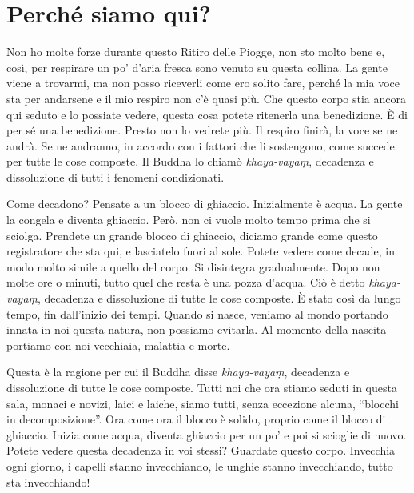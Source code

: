 \chapter{Perché siamo qui?}

Non ho molte forze durante questo Ritiro delle Piogge, non sto molto
bene e, così, per respirare un po' d'aria fresca sono venuto su questa
collina. La gente viene a trovarmi, ma non posso riceverli come ero
solito fare, perché la mia voce sta per andarsene e il mio respiro non
c'è quasi più. Che questo corpo stia ancora qui seduto e lo possiate
vedere, questa cosa potete ritenerla una benedizione. È di per sé una
benedizione. Presto non lo vedrete più. Il respiro finirà, la voce se ne
andrà. Se ne andranno, in accordo con i fattori che li sostengono, come
succede per tutte le cose composte. Il Buddha lo chiamò
\emph{khaya-vayaṃ}, decadenza e dissoluzione di tutti i fenomeni
condizionati.

Come decadono? Pensate a un blocco di ghiaccio. Inizialmente è acqua. La
gente la congela e diventa ghiaccio. Però, non ci vuole molto tempo
prima che si sciolga. Prendete un grande blocco di ghiaccio, diciamo
grande come questo registratore che sta qui, e lasciatelo fuori al sole.
Potete vedere come decade, in modo molto simile a quello del corpo. Si
disintegra gradualmente. Dopo non molte ore o minuti, tutto quel che
resta è una pozza d'acqua. Ciò è detto \emph{khaya-vayaṃ}, decadenza e
dissoluzione di tutte le cose composte. È stato così da lungo tempo, fin
dall'inizio dei tempi. Quando si nasce, veniamo al mondo portando innata
in noi questa natura, non possiamo evitarla. Al momento della nascita
portiamo con noi vecchiaia, malattia e morte.

Questa è la ragione per cui il Buddha disse \emph{khaya-vayaṃ},
decadenza e dissoluzione di tutte le cose composte. Tutti noi che ora
stiamo seduti in questa sala, monaci e novizi, laici e laiche, siamo
tutti, senza eccezione alcuna, ``blocchi in decomposizione''. Ora come
ora il blocco è solido, proprio come il blocco di ghiaccio. Inizia come
acqua, diventa ghiaccio per un po' e poi si scioglie di nuovo. Potete
vedere questa decadenza in voi stessi? Guardate questo corpo. Invecchia
ogni giorno, i capelli stanno invecchiando, le unghie stanno
invecchiando, tutto sta invecchiando!

